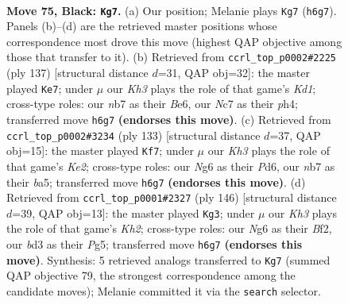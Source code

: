 \documentclass[11pt]{article}
\begin{document}
\clearpage

\begin{figure}[p]\centering
\begin{subfigure}{0.46\textwidth}\centering
\resizebox{\linewidth}{!}{%
\newchessgame
\chessboard[
  setfen={8/1Nn5/6nk/p7/Pb1pP3/1P1B3p/K3P3/8 b - - 17 75},
  showmover=false,
  pgfstyle=straightmove, color=movearrow, markmove={h6-g7}
]}
\caption{}
\end{subfigure}\hfill
\begin{subfigure}{0.46\textwidth}\centering
\resizebox{\linewidth}{!}{%
\newchessgame
\chessboard[
  setfen={3k4/3n1pp1/3Nb2p/1Pp5/6PP/5P2/4BK2/8 b - - 2 69},
  showmover=false,
  pgfstyle=straightmove, color=movearrow, markmove={d8-e7}
]}
\caption{}
\end{subfigure}
\\[4pt]
\begin{subfigure}{0.46\textwidth}\centering
\resizebox{\linewidth}{!}{%
\newchessgame
\chessboard[
  setfen={8/4k1n1/3p2p1/B1bP2P1/1pB1P3/5K2/8/8 b - - 10 67},
  showmover=false,
  pgfstyle=straightmove, color=movearrow, markmove={e7-f7}
]}
\caption{}
\end{subfigure}\hfill
\begin{subfigure}{0.46\textwidth}\centering
\resizebox{\linewidth}{!}{%
\newchessgame
\chessboard[
  setfen={B7/3kn2p/6p1/P5P1/7P/5p2/4bB1K/8 w - - 13 74},
  showmover=false,
  pgfstyle=straightmove, color=movearrow, markmove={h2-g3}
]}
\caption{}
\end{subfigure}
\caption{\textbf{Move 75, Black: \texttt{Kg7}.} (a) Our position; Melanie plays \texttt{Kg7} (\texttt{h6g7}). Panels (b)--(d) are the retrieved master positions whose correspondence most drove this move (highest QAP objective among those that transfer to it). (b) Retrieved from \texttt{ccrl\_top\_p0002\#2225} (ply 137) [structural distance $d$=31, QAP obj=32]: the master played \texttt{Ke7}; under $\mu$ our \emph{Kh3} plays the role of that game's \emph{Kd1}; cross-type roles: our \emph{n}b7 as their \emph{B}e6, our \emph{N}c7 as their \emph{p}h4; transferred move \texttt{h6g7} \textbf{(endorses this move)}. (c) Retrieved from \texttt{ccrl\_top\_p0002\#3234} (ply 133) [structural distance $d$=37, QAP obj=15]: the master played \texttt{Kf7}; under $\mu$ our \emph{Kh3} plays the role of that game's \emph{Ke2}; cross-type roles: our \emph{N}g6 as their \emph{P}d6, our \emph{n}b7 as their \emph{b}a5; transferred move \texttt{h6g7} \textbf{(endorses this move)}. (d) Retrieved from \texttt{ccrl\_top\_p0001\#2327} (ply 146) [structural distance $d$=39, QAP obj=13]: the master played \texttt{Kg3}; under $\mu$ our \emph{Kh3} plays the role of that game's \emph{Kh2}; cross-type roles: our \emph{N}g6 as their \emph{B}f2, our \emph{b}d3 as their \emph{P}g5; transferred move \texttt{h6g7} \textbf{(endorses this move)}. Synthesis: 5 retrieved analogs transferred to \texttt{Kg7} (summed QAP objective 79, the strongest correspondence among the candidate moves); Melanie committed it via the \texttt{search} selector.}
\label{fig:thought-m149}
\end{figure}
\end{document}
